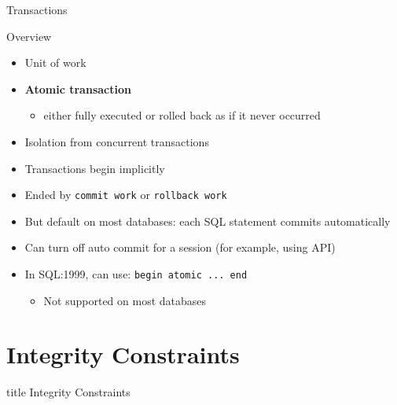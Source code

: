 \documentclass[aspectratio=169, xcolor=dvipsnames]{beamer}
\begin{document}
\begin{frame}{Transactions}
    \begin{block}{Overview}
        \begin{itemize}[<+->]
            \item Unit of work
            \item \textbf{Atomic transaction}
            \begin{itemize}
                \item[$\triangleright$] either fully executed or rolled back as if it never occurred
            \end{itemize}
            \item Isolation from concurrent transactions
            \item Transactions begin implicitly
            \item Ended by \texttt{commit work} or \texttt{rollback work}
            \item But default on most databases: each SQL statement commits automatically
            \item Can turn off auto commit for a session (for example, using API)
            \item In SQL:1999, can use: \texttt{begin atomic ... end}
            \begin{itemize}
                \item[$\triangleright$] Not supported on most databases
            \end{itemize}
        \end{itemize}
    \end{block}
\end{frame}

\section{Integrity Constraints}

\begin{frame}
  \vfill
  \centering
  \begin{beamercolorbox}[sep=8pt,center,shadow=true,rounded=true]{title}
    Integrity Constraints\par%
  \end{beamercolorbox}
  \vfill
\end{frame}
\end{document}
